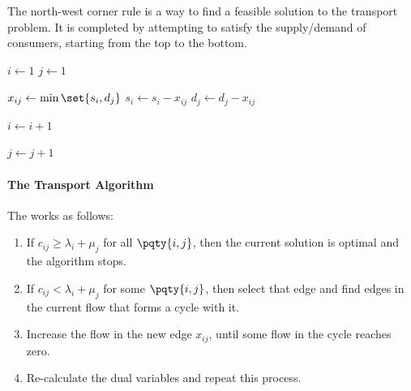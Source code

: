 The north-west corner rule is a way to find a feasible solution to the transport problem. It is completed by attempting to satisfy the supply/demand of consumers, starting from the top to the bottom.

\begin{algorithm}[ht!]
    \caption{North-West Corner Rule}\label{alg:north-west-corner-rule}%
    \begin{algorithmic}
            \State \(i \gets 1\)
            \State \(j \gets 1\)

            \Statex


                \State \(x_{ij} \gets \min \set{s_i, d_j}\)
                \State \(s_i \gets s_i - x_{ij}\)
                \State \(d_j \gets d_j - x_{ij}\)

                \Statex 

                
                    \State \(i \gets i + 1\)
                \EndIf

                    \State \(j \gets j + 1\)
                \EndIf
            \EndWhile

            \State {}
        \EndFunction
    \end{algorithmic}
\end{algorithm}

\paragraph{The Transport Algorithm} The  works as follows:
\begin{enumerate}
    \item If \(c_{ij} \geq \lambda_i + \mu_j\) for all \(\pqty{i, j}\), then the current solution is optimal and the algorithm stops.
    \item If \(c_{ij} < \lambda_i + \mu_j\) for some \(\pqty{i, j}\), then select that edge and find edges in the current flow that forms a cycle with it.
    \item Increase the flow in the new edge \(x_{ij}\), until some flow in the cycle reaches zero.
    \item Re-calculate the dual variables and repeat this process.
\end{enumerate}


